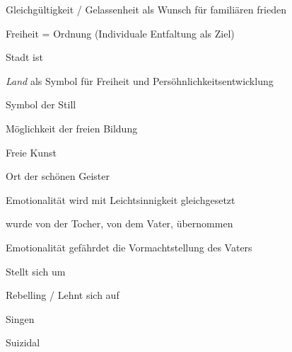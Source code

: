 \column

\stopsectionlevel

\stopsectionlevel

\startsectionlevel[title={\quotation{Verwildert}},reference={verwildert}]

\startsectionlevel[title={Unordnung},reference={unordnung}]

\startitemize[packed]
\item
  Gleichgültigkeit / Gelassenheit als Wunsch für familiären frieden
\item
  Freiheit = Ordnung (Individuale Entfaltung als Ziel)
\stopitemize

\stopsectionlevel

\startsectionlevel[title={Land},reference={land}]

\startitemize[packed]
\item
  Stadt ist 
\item
  {\em Land} als Symbol für Freiheit und Persöhnlichkeitsentwicklung
\item
  Symbol der Still
\item
  Möglichkeit der freien Bildung
\item
  Freie Kunst
\item
  Ort der schönen Geister
\stopitemize

\stopsectionlevel

\startsectionlevel[title={Emotionalität},reference={emotionalität}]

\startitemize[packed]
\item
  Emotionalität wird mit Leichtsinnigkeit gleichgesetzt
  \startitemize[packed]
  \item
    wurde von der Tocher, von dem Vater, übernommen
  \stopitemize
\item
  Emotionalität gefährdet die Vormachtstellung des Vaters
\stopitemize

\stopcolumnset

\stopsectionlevel

\stopsectionlevel

\startsectionlevel[title={Hausaufgabe: Umgang mit Konflikten in der
Familie},reference={hausaufgabe-umgang-mit-konflikten-in-der-familie}]

\startsectionlevel[title={Mutter},reference={mutter}]

\startitemize[packed]
\item
  Stellt sich um
\stopitemize

\stopsectionlevel

\startsectionlevel[title={Tochter},reference={tochter}]

\startitemize[packed]
\item
  Rebelling / Lehnt sich auf
\stopitemize

\stopsectionlevel

\startsectionlevel[title={Sohn:},reference={sohn}]

\startitemize[packed]
\item
  Singen
\item
  Suizidal
\stopitemize

\stopsectionlevel

\stopsectionlevel
